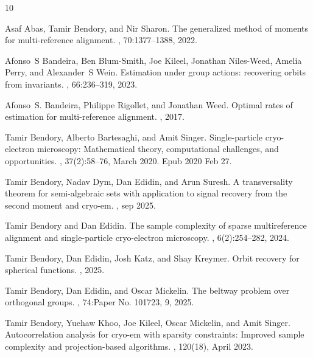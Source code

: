 \documentclass{article}
\theoremstyle{definition}
\renewcommand{\|}{|}
\begin{document}

\begin{thebibliography}{10}

Asaf Abas, Tamir Bendory, and Nir Sharon.
\newblock The generalized method of moments for multi-reference alignment.
, 70:1377–1388, 2022.

Afonso~S Bandeira, Ben Blum-Smith, Joe Kileel, Jonathan Niles-Weed, Amelia
  Perry, and Alexander~S Wein.
\newblock Estimation under group actions: recovering orbits from invariants.
, 66:236--319, 2023.

Afonso~S. Bandeira, Philippe Rigollet, and Jonathan Weed.
\newblock Optimal rates of estimation for multi-reference alignment.
, 2017.

Tamir Bendory, Alberto Bartesaghi, and Amit Singer.
\newblock Single-particle cryo-electron microscopy: Mathematical theory,
  computational challenges, and opportunities.
, 37(2):58--76, March 2020.
\newblock Epub 2020 Feb 27.

Tamir Bendory, Nadav Dym, Dan Edidin, and Arun Suresh.
\newblock A transversality theorem for semi-algebraic sets with application to
  signal recovery from the second moment and cryo-em.
, sep 2025.

Tamir Bendory and Dan Edidin.
\newblock The sample complexity of sparse multireference alignment and
  single-particle cryo-electron microscopy.
, 6(2):254--282,
  2024.

Tamir Bendory, Dan Edidin, Josh Katz, and Shay Kreymer.
\newblock Orbit recovery for spherical functions.
, 2025.

Tamir Bendory, Dan Edidin, and Oscar Mickelin.
\newblock The beltway problem over orthogonal groups.
, 74:Paper No. 101723, 9, 2025.

Tamir Bendory, Yuehaw Khoo, Joe Kileel, Oscar Mickelin, and Amit Singer.
\newblock Autocorrelation analysis for cryo-em with sparsity constraints:
  Improved sample complexity and projection-based algorithms.
, 120(18), April
  2023.


\end{thebibliography}
\end{document}
